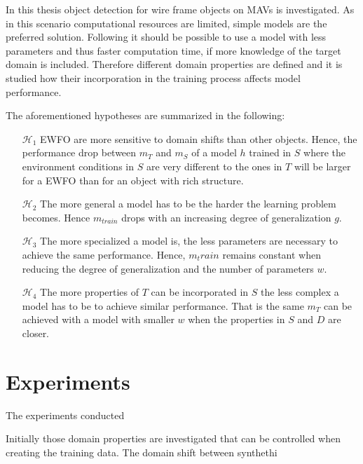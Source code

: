 In this thesis object detection for wire frame objects on \acp{MAV} is investigated. As in this scenario computational resources are limited, simple models are the preferred solution. Following  it should be possible to use a model with less parameters and thus faster computation time, if more knowledge of the target domain is included. Therefore different domain properties are defined and it is studied how their incorporation in the training process affects model performance.

The aforementioned hypotheses are summarized in the following:

\begin{enumerate}
	\item[$\mathcal{H}_1$] \ac{EWFO} are more sensitive to domain shifts than other objects. Hence, the performance drop between $m_T$ and $m_S$ of a model $h$ trained in $S$ where the environment conditions in $S$ are very different to the ones in $T$ will be larger for a \ac{EWFO} than for an object with rich structure.
	
	\item[$\mathcal{H}_2$] The more general a model has to be the harder the learning problem becomes. Hence $m_{train}$ drops with an increasing degree of generalization $g$.
	
	\item[$\mathcal{H}_3$] The more specialized a model is, the less parameters are necessary to achieve the same performance. Hence, $m_train$ remains constant when reducing the degree of generalization and the number of parameters $w$.
	
	\item[$\mathcal{H}_4$] The more properties of $T$ can be incorporated in $S$ the less complex a model has to be to achieve similar performance. That is the same $m_T$ can be achieved with a model with smaller $w$ when the properties in $S$ and $D$ are closer.
\end{enumerate}







\section{Experiments}
\label{sec:training:experiments}


The experiments conducted

Initially those domain properties are investigated that can be controlled when creating the training data. The domain shift between synthethi


